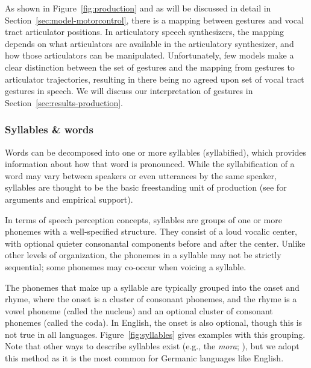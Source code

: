 As shown in Figure~\ref{fig:production}
and as will be discussed in detail
in Section~\ref{sec:model-motorcontrol},
there is a mapping
between gestures and
vocal tract articulator positions.
In articulatory speech synthesizers,
the mapping depends on what articulators
are available in the articulatory synthesizer,
and how those articulators can be manipulated.
Unfortunately, few models make a clear distinction
between the set of gestures
and the mapping from gestures
to articulator trajectories,
resulting in there being
no agreed upon set of vocal tract gestures
in speech.
We will discuss our interpretation
of gestures in Section~\ref{sec:results-production}.

\subsubsection{Syllables \& words}
\label{sec:syll-words}

Words can be decomposed into one or more syllables
(syllabified),
which provides information about
how that word is pronounced.
While the syllabification of a word
may vary between speakers
or even utterances by the same speaker,
syllables are thought to be the
basic freestanding unit of production
(see \citealt{levelt1994,levelt1999,cholin2004}
for arguments and empirical support).

In terms of speech perception concepts,
syllables are groups of one or more phonemes
with a well-specified structure.
They consist of a loud vocalic center,
with optional quieter consonantal components
before and after the center.
Unlike other levels of organization,
the phonemes in a syllable
may not be strictly sequential;
some phonemes may co-occur
when voicing a syllable.

The phonemes that make up a syllable
are typically grouped into
the onset and rhyme,
where the onset is a cluster of
consonant phonemes,
and the rhyme is a vowel phoneme
(called the nucleus)
and an optional cluster of consonant
phonemes (called the coda).
In English, the onset is also optional,
though this is not true in all languages.
Figure~\ref{fig:syllables} gives
examples with this grouping.
Note that other ways to describe
syllables exist
(e.g., the \textit{mora}; \citealt{otake1993}),
but we adopt this method
as it is the most common
for Germanic languages like English.


